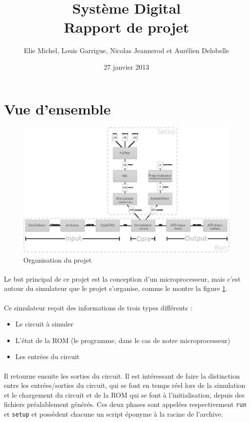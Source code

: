 \documentclass{article}
\title{Système Digital\\Rapport de projet}
\author{Elie Michel, Louis Garrigue, Nicolas Jeannerod et Aurélien Delobelle}
\date{27 janvier 2013}
\begin{document}
\maketitle

\section{Vue d'ensemble}

\begin{figure}[h]
\centering
\includegraphics{organisation.eps}
\caption{\label{orga} Organisation du projet}
\end{figure}
\paragraph{}Le but principal de ce projet est la conception d'un microprocesseur, mais c'est autour du simulateur que le projet s'organise, comme le montre la figure \ref{orga}.

\paragraph{}Ce simulateur reçoit des informations de trois types différents :
\begin{itemize}
	\item Le circuit à simuler
	\item L'état de la ROM (le programme, dans le cas de notre microprocesseur)
	\item Les entrées du circuit
\end{itemize}

\paragraph{}Il retourne ensuite les sorties du circuit. Il est intéressant de faire la distinction entre les entrées/sorties du circuit, qui se font en temps réel lors de la simulation et le chargement du circuit et de la ROM qui se font à l'initialisation, depuis des fichiers préalablement générés. Ces deux phases sont appelées respectivement \texttt{run} et \texttt{setup} et possèdent chacune un script éponyme à la racine de l'archive.
\end{document}
